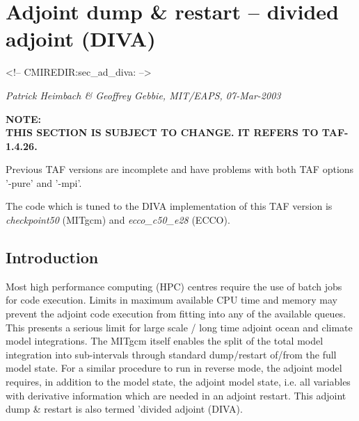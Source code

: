 
\section{Adjoint dump \& restart -- divided adjoint (DIVA)
\label{sec_ad_diva}}
\begin{rawhtml}
<!-- CMIREDIR:sec_ad_diva: -->
\end{rawhtml}

{\it Patrick Heimbach \& Geoffrey Gebbie, MIT/EAPS, 07-Mar-2003}

{\bf 
NOTE: \\
THIS SECTION IS SUBJECT TO CHANGE.
IT REFERS TO TAF-1.4.26.

Previous TAF versions are incomplete and have problems 
with both TAF options '-pure' and '-mpi'.

The code which is tuned to the DIVA implementation 
of this TAF version
is {\it checkpoint50} (MITgcm) and {\it ecco\_c50\_e28} (ECCO).
}

\subsection{Introduction}

Most high performance computing (HPC) centres require the use
of batch jobs for code execution. 
Limits in maximum available CPU time and memory may prevent
the adjoint code execution from fitting into any of the available
queues. This presents a serious limit for large scale /
long time adjoint ocean and climate model integrations.
The MITgcm itself enables the split of the total model 
integration into sub-intervals through standard dump/restart 
of/from the full model state.
For a similar procedure to run in reverse mode,
the adjoint model requires, in addition to the model state, 
the adjoint model state,
i.e. all variables with derivative information
which are needed in an adjoint restart.
This adjoint dump \& restart is also termed 'divided adjoint (DIVA).

